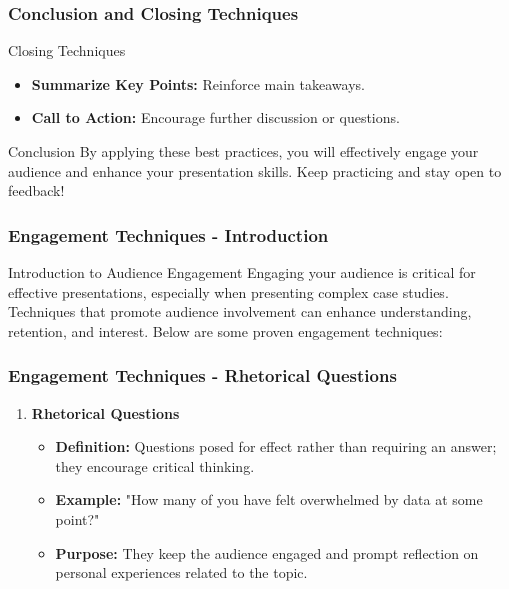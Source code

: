 \documentclass[aspectratio=169]{beamer}
\begin{document}
\begin{frame}[fragile]
    \frametitle{Conclusion and Closing Techniques}
    \begin{block}{Closing Techniques}
        \begin{itemize}
            \item \textbf{Summarize Key Points:} Reinforce main takeaways.
            \item \textbf{Call to Action:} Encourage further discussion or questions.
        \end{itemize}
    \end{block}

    \begin{block}{Conclusion}
        By applying these best practices, you will effectively engage your audience and enhance your presentation skills. Keep practicing and stay open to feedback!
    \end{block}
\end{frame}

\begin{frame}[fragile]
    \frametitle{Engagement Techniques - Introduction}
    \begin{block}{Introduction to Audience Engagement}
        Engaging your audience is critical for effective presentations, especially when presenting complex case studies. Techniques that promote audience involvement can enhance understanding, retention, and interest. Below are some proven engagement techniques:
    \end{block}
\end{frame}

\begin{frame}[fragile]
    \frametitle{Engagement Techniques - Rhetorical Questions}
    \begin{enumerate}
        \item \textbf{Rhetorical Questions}
            \begin{itemize}
                \item \textbf{Definition:} Questions posed for effect rather than requiring an answer; they encourage critical thinking.
                \item \textbf{Example:} "How many of you have felt overwhelmed by data at some point?"
                \item \textbf{Purpose:} They keep the audience engaged and prompt reflection on personal experiences related to the topic.
            \end{itemize}
    \end{enumerate}
\end{frame}
\end{document}
